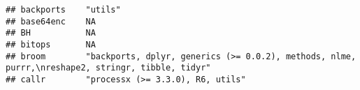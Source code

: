 \documentclass[]{article}
\begin{document}
\begin{verbatim}
## backports    "utils"                                                                                                                                                                                                                                                                                                                                                                                                                                                                               
## base64enc    NA                                                                                                                                                                                                                                                                                                                                                                                                                                                                                    
## BH           NA                                                                                                                                                                                                                                                                                                                                                                                                                                                                                    
## bitops       NA                                                                                                                                                                                                                                                                                                                                                                                                                                                                                    
## broom        "backports, dplyr, generics (>= 0.0.2), methods, nlme, purrr,\nreshape2, stringr, tibble, tidyr"                                                                                                                                                                                                                                                                                                                                                                                      
## callr        "processx (>= 3.3.0), R6, utils"                                                                                                                                                                                                                                                                                                                                                                                                                                                      

\end{verbatim}
\end{document}
